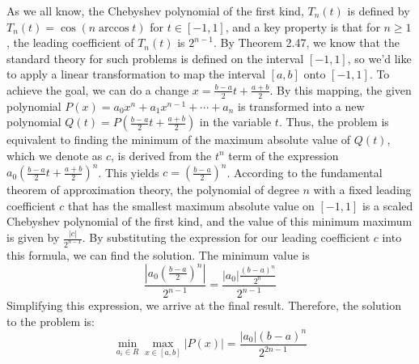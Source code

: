 \documentclass[a4paper]{article}
\begin{document}
As we all know, the Chebyshev polynomial of the first kind, $T_n(t)$ is defined by $T_n(t)=\cos(n \arccos t)$ for $t\in[-1,1]$, and a key property is that for $n\geq 1$, the leading coefficient
of $T_n(t)$ is $2^{n-1}$.
By Theorem 2.47, we know that the standard theory for such problems is defined on the interval $[-1,1]$, so we'd like to apply a linear
transformation to map the interval $[a,b]$ onto $[-1,1]$. To achieve the goal, we can do a change $x=\frac{b-a}{2}t+\frac{a+b}{2}$. By this mapping, the given
polynomial $P(x)=a_0x^n+a_1x^{n-1}+\cdots+a_n$ is transformed into a new polynomial $Q(t)=P(\frac{b-a}{2}t+\frac{a+b}{2})$ in the variable $t$. Thus, the problem is 
equivalent to finding the minimum of the maximum absolute value of $Q(t)$, which we denote as $c$, is derived from the $t^n$ term of the expression $a_0(\frac{b-a}{2}t+\frac{a+b}{2})^n$. This yields $c=(\frac{b-a}{2})^n$.\newline
According to the fundamental theorem of approximation theory, the polynomial of degree $n$ with a fixed leading coefficient $c$ that has the smallest maximum absolute value on $[-1, 1]$ is a scaled Chebyshev polynomial of the first kind, and the value of this minimum maximum is given by $\frac{|c|}{2^{n-1}}$. By substituting the expression for our leading coefficient $c$ into this formula, we can find the solution. The minimum value is
$$ \frac{\left| a_0 \left( \frac{b-a}{2} \right)^n \right|}{2^{n-1}} = \frac{|a_0| \frac{(b-a)^n}{2^n}}{2^{n-1}} $$
Simplifying this expression, we arrive at the final result. Therefore, the solution to the problem is:
$$ \min_{a_i \in R} \max_{x \in [a,b]} |P(x)| = \frac{|a_0|(b-a)^n}{2^{2n-1}} $$
\end{document}
